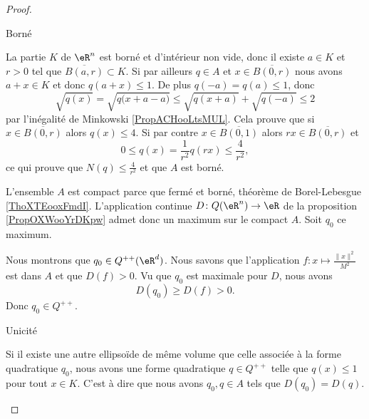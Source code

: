 \begin{proof}
\begin{subproof}
\begin{subproof}
        \item[Borné]

            La partie \( K\) de \( \eR^n\) est borné et d'intérieur non vide, donc il existe \( a\in K\) et \( r>0\) tel que \( \overline{ B(a,r) }\subset K\). Si par ailleurs \( q\in A\) et \( x\in\overline{ B(0,r) }\) nous avons \( a+x\in K\) et donc \( q(a+x)\leq 1\). De plus \( q(-a)=q(a)\leq 1\), donc
            \begin{equation}
                \sqrt{q(x)}=\sqrt{q\big( x+a-a \big)}\leq \sqrt{q(x+a)}+\sqrt{q(-a)}\leq 2
            \end{equation}
            par l'inégalité de Minkowski \ref{PropACHooLtsMUL}. Cela prouve que si \( x\in\overline{ B(0,r) }\) alors \( q(x)\leq 4\). Si par contre \( x\in\overline{ B(0,1) }\) alors \( rx\in\overline{ B(0,r) } \) et 
            \begin{equation}
                0\leq q(x)=\frac{1}{ r^2 }q(rx)\leq \frac{ 4 }{ r^2 },
            \end{equation}
            ce qui prouve que \( N(q)\leq \frac{ 4 }{ r^2 }\) et que \( A\) est borné.


            \end{subproof}

            L'ensemble \( A\) est compact parce que fermé et borné, théorème de Borel-Lebesgue \ref{ThoXTEooxFmdI}. L'application continue \( D\colon Q(\eR^n)\to \eR\) de la proposition \ref{PropOXWooYrDKpw} admet donc un maximum sur le compact \( A\). Soit \( q_0\) ce maximum.

            Nous montrons que \( q_0\in Q^{++}(\eR^d)\). Nous savons que l'application \( f\colon x\mapsto \frac{ \| x \|^2 }{ M^2 }\) est dans \( A\) et que \( D(f)>0\). Vu que \( q_0\) est maximale pour \( D\), nous avons
            \begin{equation}
                D(q_0)\geq D(f)>0.
            \end{equation}
            Donc \( q_0\in Q^{++}\).

        \item[Unicité]

            Si il existe une autre ellipsoïde de même volume que celle associée à la forme quadratique \( q_0\), nous avons une forme quadratique \( q\in Q^{++}\) telle que \( q(x)\leq 1\) pour tout \( x\in K\). C'est à dire que nous avons \( q_0,q\in A\) tels que \( D(q_0)=D(q)\).


\end{subproof}
\end{proof}
